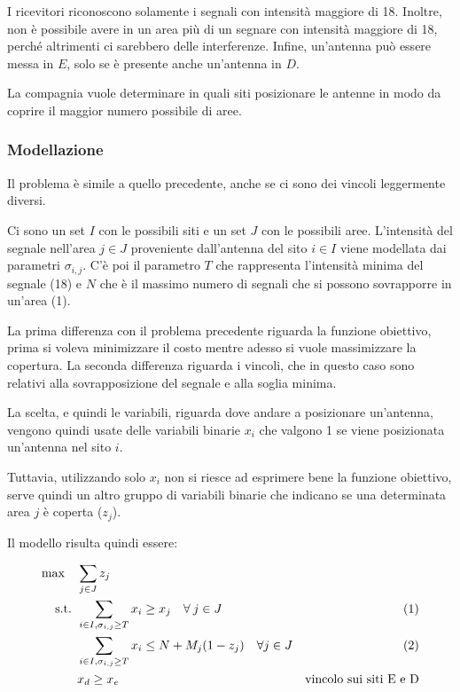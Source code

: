 \noindent I ricevitori riconoscono solamente i segnali con intensità maggiore di 18. Inoltre, non è possibile avere in un area più di un segnare con intensità maggiore di 18, perché altrimenti ci sarebbero delle interferenze. Infine, un'antenna può essere messa in $E$, solo se è presente anche un'antenna in $D$.

La compagnia vuole determinare in quali siti posizionare le antenne in modo da coprire il maggior numero possibile di aree.

\subsubsection{Modellazione}

Il problema è simile a quello precedente, anche se ci sono dei vincoli leggermente diversi.

Ci sono un set $I$ con le possibili siti e un set $J$ con le possibili aree.
L'intensità del segnale nell'area $j \in J$ proveniente dall'antenna del sito $i \in I$ viene modellata dai parametri $\sigma_{i,j}$. C'è poi il parametro $T$ che rappresenta l'intensità minima del segnale (18) e $N$ che è il massimo numero di segnali che si possono sovrapporre in un'area (1).

La prima differenza con il problema precedente riguarda la funzione obiettivo, prima si voleva minimizzare il costo mentre adesso si vuole massimizzare la copertura. La seconda differenza riguarda i vincoli, che in questo caso sono relativi alla sovrapposizione del segnale e alla soglia minima.

La scelta, e quindi le variabili, riguarda dove andare a posizionare un'antenna, vengono quindi usate delle variabili binarie $x_i$ che valgono 1 se viene posizionata un'antenna nel sito $i$.

Tuttavia, utilizzando solo $x_i$ non si riesce ad esprimere bene la funzione obiettivo, serve quindi un altro gruppo di variabili binarie che indicano se una determinata area $j$ è coperta ($z_j$).

Il modello risulta quindi essere:

\begin{align*}
\max \quad & \sum\limits_{j \in J} z_j \\
\text{s.t. } & \sum\limits_{i \in I, \sigma_{i,j} \geq T} x_i \geq x_j \quad \forall \: j \in J &\text{(1)}\\
	& \sum\limits_{i \in I, \sigma_{i,j} \geq T} x_i \leq N + M_j(1-z_j) \quad \forall j \in J &\text{(2)} \\
	& x_d \geq x_e & \text{vincolo sui siti E e D}
\end{align*}

